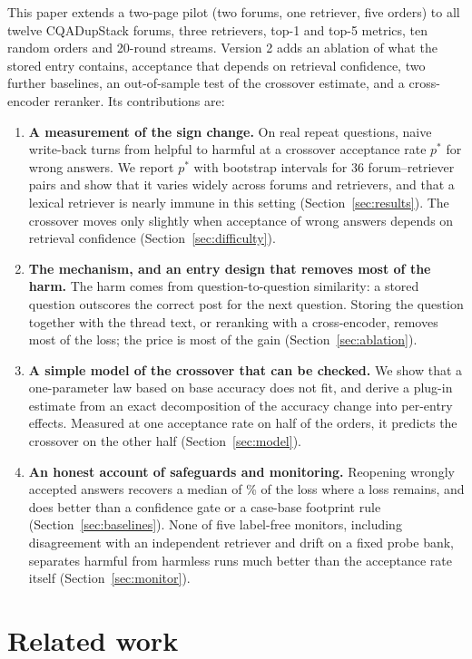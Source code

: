 \documentclass[11pt]{article}
\begin{document}
This paper extends a two-page pilot (two forums, one retriever, five orders) to all twelve CQADupStack forums, three retrievers, top-1 and top-5 metrics, ten random orders and 20-round streams. Version 2 adds an ablation of what the stored entry contains, acceptance that depends on retrieval confidence, two further baselines, an out-of-sample test of the crossover estimate, and a cross-encoder reranker. Its contributions are:
\begin{enumerate}
\item \textbf{A measurement of the sign change.} On real repeat questions, naive write-back turns from helpful to harmful at a crossover acceptance rate $p^*$ for wrong answers. We report $p^*$ with bootstrap intervals for 36 forum--retriever pairs and show that it varies widely across forums and retrievers, and that a lexical retriever is nearly immune in this setting (Section~\ref{sec:results}). The crossover moves only slightly when acceptance of wrong answers depends on retrieval confidence (Section~\ref{sec:difficulty}).
\item \textbf{The mechanism, and an entry design that removes most of the harm.} The harm comes from question-to-question similarity: a stored question outscores the correct post for the next question. Storing the question together with the thread text, or reranking with a cross-encoder, removes most of the loss; the price is most of the gain (Section~\ref{sec:ablation}).
\item \textbf{A simple model of the crossover that can be checked.} We show that a one-parameter law based on base accuracy does not fit, and derive a plug-in estimate from an exact decomposition of the accuracy change into per-entry effects. Measured at one acceptance rate on half of the orders, it predicts the crossover on the other half (Section~\ref{sec:model}).
\item \textbf{An honest account of safeguards and monitoring.} Reopening wrongly accepted answers recovers a median of \recMedStill\% of the loss where a loss remains, and does better than a confidence gate or a case-base footprint rule (Section~\ref{sec:baselines}). None of five label-free monitors, including disagreement with an independent retriever and drift on a fixed probe bank, separates harmful from harmless runs much better than the acceptance rate itself (Section~\ref{sec:monitor}).
\end{enumerate}

\section{Related work}
\end{document}
